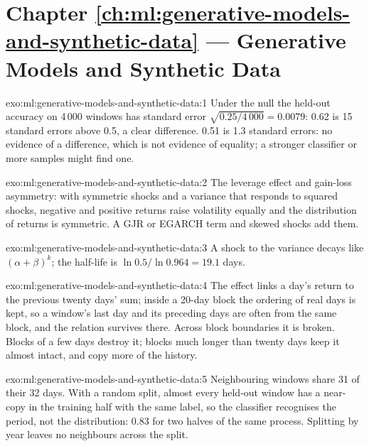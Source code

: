 \section*{Chapter \ref{ch:ml:generative-models-and-synthetic-data} --- Generative Models and Synthetic Data}

\begin{solution}{exo:ml:generative-models-and-synthetic-data:1}
Under the null the held-out accuracy on 4\,000 windows has standard error $\sqrt{0.25/4\,000} = 0.0079$: 0.62 is 15
standard errors above 0.5, a clear difference. 0.51 is 1.3 standard errors: no evidence of a difference, which is not
evidence of equality; a stronger classifier or more samples might find one.
\end{solution}

\begin{solution}{exo:ml:generative-models-and-synthetic-data:2}
The leverage effect and gain-loss asymmetry: with symmetric shocks and a variance that responds to squared shocks, negative
and positive returns raise volatility equally and the distribution of returns is symmetric. A GJR or EGARCH term and skewed
shocks add them.
\end{solution}

\begin{solution}{exo:ml:generative-models-and-synthetic-data:3}
A shock to the variance decays like $(\alpha + \beta)^k$; the half-life is $\ln 0.5/\ln 0.964 = 19.1$ days.
\end{solution}

\begin{solution}{exo:ml:generative-models-and-synthetic-data:4}
The effect links a day's return to the previous twenty days' sum; inside a 20-day block the ordering of real days is kept,
so a window's last day and its preceding days are often from the same block, and the relation survives there. Across block
boundaries it is broken. Blocks of a few days destroy it; blocks much longer than twenty days keep it almost intact, and
copy more of the history.
\end{solution}

\begin{solution}{exo:ml:generative-models-and-synthetic-data:5}
Neighbouring windows share 31 of their 32 days. With a random split, almost every held-out window has a near-copy in the
training half with the same label, so the classifier recognises the period, not the distribution: 0.83 for two halves of
the same process. Splitting by year leaves no neighbours across the split.
\end{solution}

